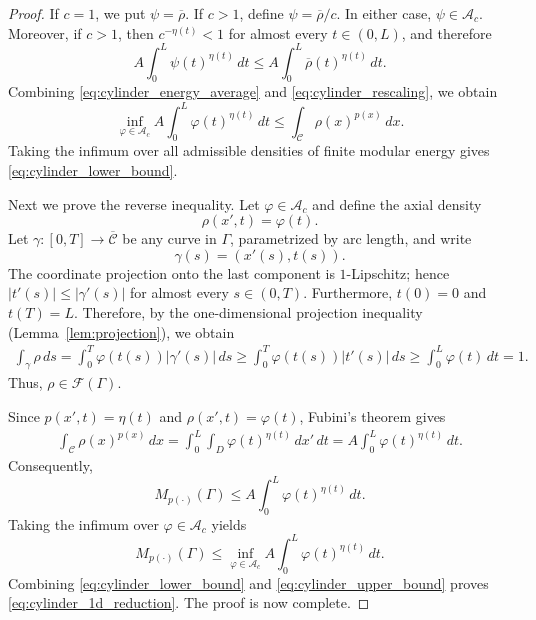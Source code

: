 \documentclass[12pt]{amsart}
\numberwithin{equation}{section}
\theoremstyle{plain}
\theoremstyle{definition}
\begin{document}
\begin{proof}
If $c=1$, we put
$\psi=\overline\rho$.
If $c>1$, define
$\psi=\overline\rho/c$.
In either case, $\psi\in\mathcal A_c$.
Moreover, if $c>1$, then $c^{-\eta(t)}<1$
for almost every $t\in(0,L)$,
and therefore
\begin{equation}
\label{eq:cylinder_rescaling}
A\int_0^L\psi(t)^{\eta(t)}\,dt
\le
A\int_0^L\overline\rho(t)^{\eta(t)}\,dt.
\end{equation}
Combining \eqref{eq:cylinder_energy_average} and
\eqref{eq:cylinder_rescaling}, we obtain
\begin{equation*}
\inf_{\varphi\in\mathcal A_c}
A\int_0^L\varphi(t)^{\eta(t)}\,dt
\le
\int_{\mathcal C}\rho(x)^{p(x)}\,dx.
\end{equation*}
Taking the infimum over all admissible densities of finite modular
energy gives \eqref{eq:cylinder_lower_bound}.

Next we prove the reverse inequality. Let
$\varphi\in\mathcal A_c$ and define the axial density
\begin{equation}
\label{eq:cylinder_axial_density}
\rho(x',t)=\varphi(t).
\end{equation}
Let $\gamma:[0,T]\longrightarrow\overline{\mathcal C}$
be any curve in $\Gamma$, parametrized by arc length, and write
\begin{equation*}
\gamma(s)=(x'(s),t(s)).
\end{equation*}
The coordinate projection onto the last component is $1$-Lipschitz;
hence $|t'(s)|\le|\gamma'(s)|$ for almost every $s\in(0,T)$.
Furthermore, $t(0)=0$ and $t(T)=L$.
Therefore, by the one-dimensional projection inequality
(Lemma~\ref{lem:projection}), we obtain
\begin{align}
\int_\gamma\rho\,ds
=
\int_0^T
\varphi(t(s))|\gamma'(s)|\,ds
\ge
\int_0^T
\varphi(t(s))|t'(s)|\,ds
\ge
\int_0^L\varphi(t)\,dt
=
1.
\label{eq:cylinder_axial_admissibility}
\end{align}
Thus, $\rho\in\mathcal F(\Gamma)$.

Since $p(x',t)=\eta(t)$ and $\rho(x',t)=\varphi(t)$,
Fubini's theorem gives
\begin{align}
\int_{\mathcal C}\rho(x)^{p(x)}\,dx
=
\int_0^L
\int_D
\varphi(t)^{\eta(t)}\,dx'\,dt
=
A\int_0^L
\varphi(t)^{\eta(t)}\,dt.
\label{eq:cylinder_axial_energy}
\end{align}
Consequently,
\begin{equation*}
M_{p(\cdot)}(\Gamma)
\le
A\int_0^L\varphi(t)^{\eta(t)}\,dt.
\end{equation*}
Taking the infimum over $\varphi\in\mathcal A_c$ yields
\begin{equation}
\label{eq:cylinder_upper_bound}
M_{p(\cdot)}(\Gamma)
\le
\inf_{\varphi\in\mathcal A_c}
A\int_0^L\varphi(t)^{\eta(t)}\,dt.
\end{equation}
Combining \eqref{eq:cylinder_lower_bound} and
\eqref{eq:cylinder_upper_bound} proves \eqref{eq:cylinder_1d_reduction}. The proof is now complete.
\end{proof}
\end{document}
